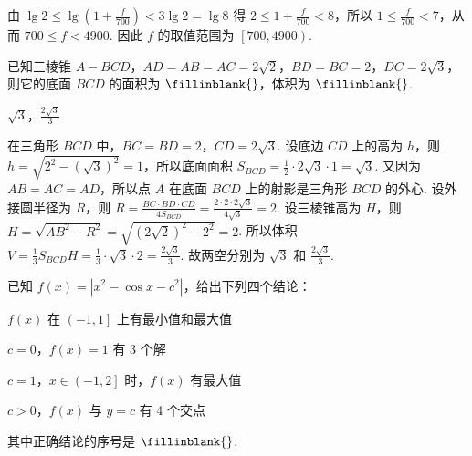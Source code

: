 \documentclass[UTF8,a4paper,oneside,11pt]{ctexbook}
\begin{document}
\begin{solution}
由 \( \lg 2\le \lg \left( 1+\frac{f}{700} \right)<3\lg 2=\lg 8 \)
得 \( 2\le 1+\frac{f}{700}<8 \)，所以 \( 1\le \frac{f}{700}<7 \)，从而 \( 700\le f<4900 \). 因此 \( f \) 的取值范围为 \( \left[ 700,4900 \right) \).
\end{solution}

\begin{problem}
已知三棱锥 \( A-BCD \)，\( AD=AB=AC=2\sqrt{2} \)，\( BD=BC=2 \)，\( DC=2\sqrt{3} \)，则它的底面 \(BCD\) 的面积为 \(\fillinblank{} \)，体积为 \(\fillinblank{} \).

\end{problem}

\begin{answer}
\(\sqrt{3}\)，\(\frac{2\sqrt{3}}{3}\)
\end{answer}

\begin{solution}
在三角形 \(BCD\) 中，\( BC=BD=2 \)，\( CD=2\sqrt{3} \). 设底边 \(CD\) 上的高为 \( h \)，则 \( h=\sqrt{2^2-\left( \sqrt{3} \right)^2}=1 \)，所以底面面积 \( S_{BCD}=\frac{1}{2}\cdot 2\sqrt{3}\cdot 1=\sqrt{3} \).
又因为 \( AB=AC=AD \)，所以点 \(A\) 在底面 \(BCD\) 上的射影是三角形 \(BCD\) 的外心. 设外接圆半径为 \(R\)，则 \( R=\frac{BC\cdot BD\cdot CD}{4S_{BCD}}=\frac{2\cdot 2\cdot 2\sqrt{3}}{4\sqrt{3}}=2 \).
设三棱锥高为 \(H\)，则 \( H=\sqrt{AB^2-R^2}=\sqrt{\left( 2\sqrt{2} \right)^2-2^2}=2 \). 所以体积 \( V=\frac{1}{3}S_{BCD}H=\frac{1}{3}\cdot \sqrt{3}\cdot 2=\frac{2\sqrt{3}}{3} \).
故两空分别为 \( \sqrt{3} \) 和 \( \frac{2\sqrt{3}}{3} \).
\end{solution}

\begin{problem}
已知 \( f(x)=\left| x^2-\cos x-c^2 \right| \)，给出下列四个结论：

\begin{circlelist}
\item \( f(x) \) 在 \( \left( -1,1 \right] \) 上有最小值和最大值
\item \( c=0 \)，\( f(x)=1 \) 有 3 个解
\item \( c=1 \)，\( x\in \left( -1,2 \right] \) 时，\( f(x) \) 有最大值
\item \( c>0 \)，\( f(x) \) 与 \( y=c \) 有 4 个交点
\end{circlelist}

其中正确结论的序号是 \(\fillinblank{} \).
\end{problem}
\end{document}
